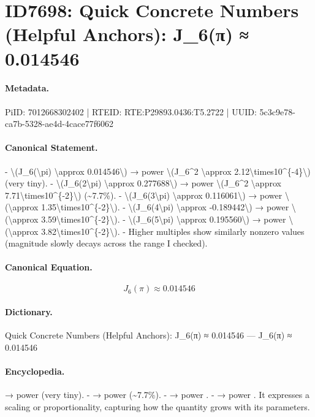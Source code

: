 \section*{ID7698: Quick Concrete Numbers (Helpful Anchors): J\_6(π) ≈ 0.014546}
\paragraph{Metadata.}
PiID: 7012668302402 | RTEID: RTE:P29893.0436:T5.2722 | UUID: 5c3c9e78-ca7b-5328-ae4d-4cace77f6062

\paragraph{Canonical Statement.}
- \textbackslash{}(J\_6(\textbackslash{}pi) \textbackslash{}approx 0.014546\textbackslash{}) → power \textbackslash{}(J\_6\textasciicircum{}2 \textbackslash{}approx 2.12\textbackslash{}times10\textasciicircum{}\{-4\}\textbackslash{}) (very tiny). - \textbackslash{}(J\_6(2\textbackslash{}pi) \textbackslash{}approx 0.277688\textbackslash{}) → power \textbackslash{}(J\_6\textasciicircum{}2 \textbackslash{}approx 7.71\textbackslash{}times10\textasciicircum{}\{-2\}\textbackslash{}) (\textasciitilde{}7.7\%). - \textbackslash{}(J\_6(3\textbackslash{}pi) \textbackslash{}approx 0.116061\textbackslash{}) → power \textbackslash{}(\textbackslash{}approx 1.35\textbackslash{}times10\textasciicircum{}\{-2\}\textbackslash{}). - \textbackslash{}(J\_6(4\textbackslash{}pi) \textbackslash{}approx -0.189442\textbackslash{}) → power \textbackslash{}(\textbackslash{}approx 3.59\textbackslash{}times10\textasciicircum{}\{-2\}\textbackslash{}). - \textbackslash{}(J\_6(5\textbackslash{}pi) \textbackslash{}approx 0.195560\textbackslash{}) → power \textbackslash{}(\textbackslash{}approx 3.82\textbackslash{}times10\textasciicircum{}\{-2\}\textbackslash{}). - Higher multiples show similarly nonzero values (magnitude slowly decays across the range I checked).

\paragraph{Canonical Equation.}
\[
J_6(\pi) \approx 0.014546
\]

\paragraph{Dictionary.}
Quick Concrete Numbers (Helpful Anchors): J\_6(π) ≈ 0.014546 — J\_6(π) ≈ 0.014546

\paragraph{Encyclopedia.}
→ power (very tiny). - → power (\textasciitilde{}7.7\%). - → power . - → power . It expresses a scaling or proportionality, capturing how the quantity grows with its parameters.
